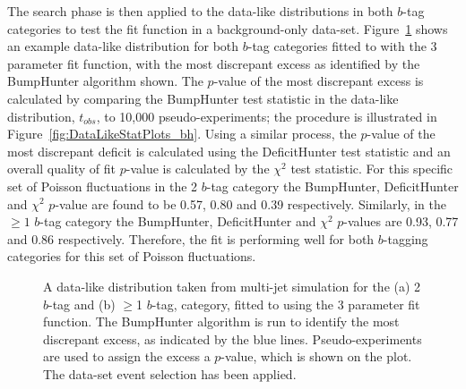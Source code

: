 The search phase is then applied to the data-like distributions
in both $b$-tag categories 
to test the fit function in a background-only data-set.
Figure~\ref{fig:DataLikeSearchPhase} shows an example data-like distribution for both $b$-tag categories fitted
to with the 3 parameter fit function,
with the most discrepant excess as identified by the BumpHunter algorithm shown.
The $p$-value of the most discrepant excess is calculated by comparing the BumpHunter test statistic in the data-like distribution, $t_{obs}$,
to 10,000 pseudo-experiments; the procedure is illustrated in Figure~\ref{fig:DataLikeStatPlots_bh}.
Using a similar process, the $p$-value of the most discrepant deficit is calculated using the DeficitHunter test statistic
and an overall quality of fit $p$-value is calculated by the $\chi^{2}$ test statistic.
For this specific set of Poisson fluctuations in the 2 $b$-tag category
the BumpHunter, DeficitHunter and  $\chi^{2}$ $p$-value are found to be
0.57, 0.80 and 0.39 respectively.
Similarly, in the $\geq1$ $b$-tag category the
BumpHunter, DeficitHunter and  $\chi^{2}$ $p$-values are
0.93, 0.77 and 0.86 respectively.
Therefore, the fit is performing well for both $b$-tagging categories for this set of Poisson fluctuations.\\

\begin{figure}[!ht]
  \begin{center}
   \captionsetup[subfigure]{aboveskip=0pt,justification=centering}
  \end{center}
  \caption{A data-like distribution taken from multi-jet simulation for the (a) 2 $b$-tag and (b) $\geq$1 $b$-tag,
    category, fitted to using the 3 parameter fit function.
    The BumpHunter algorithm is run to identify the most discrepant excess, as indicated by the blue lines.
    Pseudo-experiments are used to assign the excess a $p$-value, which is shown on the plot.
    The \summer{} data-set event selection has been applied.}
  \label{fig:DataLikeSearchPhase}
\end{figure}

